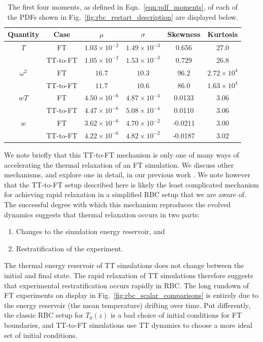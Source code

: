 \documentclass[aps, pre, onecolumn, nofootinbib, notitlepage, groupedaddress, amsfonts, amssymb, amsmath, longbibliography, superscriptaddress]{revtex4-1}
\begin{document}
\begin{table}[b!]
\vspace{-0.5cm}
\caption{ 
	The first four moments, as defined in Eqn.~\ref{eqn:pdf_moments}, of each of the PDFs shown in Fig.~\ref{fig:rbc_restart_description} are displayed below.
}
\vspace{-0.25cm}
\setlength{\tabcolsep}{12pt}
\label{table:pdf_values}
\begin{center}
\begin{tabular}{c c c c c c}
\hline																	
Quantity &	Case	&	$\mu$	&	$\sigma$	&	Skewness	&	Kurtosis \\
\hline
$T$				&	FT			&		$1.03 \times 10^{-2}$	&	$1.49 \times 10^{-3}$	&	0.656		&	27.0 \\
				&	TT-to-FT	&		$1.05 \times 10^{-2}$	&	$1.53 \times 10^{-3}$	&	0.729		&	26.8 \\
\hline
$\omega^2$		&	FT			&		$16.7$					&	$10.3$					&	96.2		&	$2.72 \times 10^4$ \\
				&	TT-to-FT	&		$11.7$					&	$10.6$					&	86.0		&	$1.63 \times 10^4$ \\
\hline
$wT$			&	FT			&		$4.50 \times 10^{-6}$	&	$4.87 \times 10^{-4}$	&	0.0133	&	$3.06$ \\
				&	TT-to-FT	&		$4.47 \times 10^{-6}$	&	$5.08 \times 10^{-4}$	&	0.0110	&	$3.06$ \\
\hline
$w$				&	FT			&		$3.62 \times 10^{-6}$	&	$4.70 \times 10^{-2}$	&	-0.0211	&	$3.00$ \\
				&	TT-to-FT	&		$4.22 \times 10^{-6}$	&	$4.82 \times 10^{-2}$	&	-0.0187	&	$3.02$ \\
\hline																	
\end{tabular}
\end{center}
\end{table}

We note briefly that this TT-to-FT mechanism is only one of many ways of accelerating the thermal relaxation of an FT simulation.
We discuss other mechanisms, and explore one in detail, in our previous work \cite{anders&all2018}.
We note however that the TT-to-FT setup described here is likely the least complicated mechanism for achieving rapid relaxation in a simplified RBC setup that we are aware of.
The successful degree with which this mechanism reproduces the evolved dynamics suggests that thermal relaxation occurs in two parts:
\begin{enumerate}
\item Changes to the simulation energy reservoir, and
\item Restratification of the experiment.
\end{enumerate}
The thermal energy reservoir of TT simulations does not change between the initial and final state.
The rapid relaxation of TT simulations therefore suggests that experimental restratification occurs rapidly in RBC. 
The long rundown of FT experiments on display in Fig.~\ref{fig:rbc_scalar_comparisons} is entirely due to the energy reservoir (the mean temperature) drifting over time.
Put differently, the classic RBC setup for $T_0(z)$ is a bad choice of initial conditions for FT boundaries, and TT-to-FT simulations use TT dynamics to choose a more ideal set of initial conditions.
\end{document}
